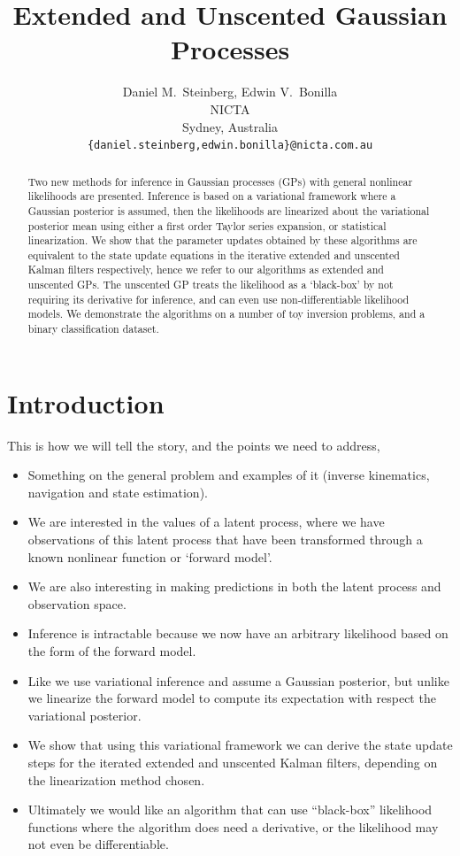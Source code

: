 \documentclass{article} %
\title{Extended and Unscented Gaussian Processes}
\author{
    Daniel M.~Steinberg, Edwin V.~Bonilla \\
    NICTA \\
    Sydney, Australia\\
    \texttt{\{daniel.steinberg,edwin.bonilla\}@nicta.com.au}
}
\begin{document}
\maketitle

\begin{abstract}

    Two new methods for inference in Gaussian processes (GPs) with general
    nonlinear likelihoods are presented. Inference is based on a variational
    framework where a Gaussian posterior is assumed, then the likelihoods are
    linearized about the variational posterior mean using either a first order
    Taylor series expansion, or statistical linearization. We show that the
    parameter updates obtained by these algorithms are equivalent to the state
    update equations in the iterative extended and unscented Kalman filters
    respectively, hence we refer to our algorithms as extended and
    unscented GPs. The unscented GP treats the likelihood as a `black-box' by
    not requiring its derivative for inference, and can even use
    non-differentiable likelihood models. We demonstrate the algorithms on a
    number of toy inversion problems, and a binary classification dataset.

\end{abstract}

\section{Introduction}

This is how we will tell the story, and the points we need to address,
\begin{itemize}
    \item Something on the general problem and examples of it (inverse
        kinematics, navigation and state estimation).
    \item We are interested in the values of a latent process, where we have
        observations of this latent process that have been transformed through
        a known nonlinear function or `forward model'.
    \item We are also interesting in making predictions in both the latent
        process and observation space.
    \item Inference is intractable because we now have an arbitrary likelihood
        based on the form of the forward model.
    \item Like \cite{Opper2009} we use variational inference and assume a
        Gaussian posterior, but unlike \cite{Opper2009} we linearize the
        forward model to compute its expectation with respect the variational
        posterior.
    \item We show that using this variational framework we can derive the state
        update steps for the iterated extended \cite{Bell1993} and
        unscented \cite{Sibley2006} Kalman filters, depending on the 
        linearization method chosen.
    \item Ultimately we would like an algorithm that can use ``black-box''
        likelihood functions where the algorithm does need a derivative, or the
        likelihood may not even be differentiable.
\end{itemize}
\end{document}
